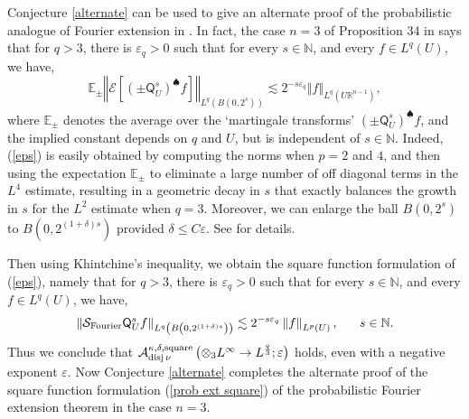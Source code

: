 \documentclass{amsart}%
\theoremstyle{plain}
\numberwithin{equation}{section}
\begin{document}
Conjecture \ref{alternate} can be used to give an alternate proof of the
probabilistic analogue of Fourier extension in \cite{Saw7}. In fact, the case
$n=3$ of Proposition 34 in \cite{Saw7} says that for $q>3$, there is
$\varepsilon_{q}>0$ such that for every $s\in\mathbb{N}$, and every $f\in
L^{q}\left(  U\right)  $, we have,
\begin{equation}
\mathbb{E}_{\pm}\left\Vert \mathcal{E}\left[  \left(  \pm\mathsf{Q}_{U}%
^{s}\right)  ^{\spadesuit}f\right]  \right\Vert _{L^{q}\left(  B\left(
0,2^{s}\right)  \right)  }\lesssim2^{-s\varepsilon_{q}}\left\Vert f\right\Vert
_{L^{q}\left(  U\mathbb{R}^{n-1}\right)  },\label{eps}%
\end{equation}
where $\mathbb{E}_{\pm}$ denotes the average over the `martingale transforms'
$\left(  \pm\mathsf{Q}_{U}^{s}\right)  ^{\spadesuit}f$, and the implied
constant depends on $q$ and $U$, but is independent of $s\in\mathbb{N}$.
Indeed, (\ref{eps}) is easily obtained by computing the norms when $p=2$ and
$4$, and then using the expectation $\mathbb{E}_{\pm}$ to eliminate a large
number of off diagonal terms in the $L^{4}$ estimate, resulting in a geometric
decay in $s$ that exactly balances the growth in $s$ for the $L^{2} $ estimate
when $q=3$. Moreover, we can enlarge the ball $B\left(  0,2^{s}\right)  $ to
$B\left(  0,2^{\left(  1+\delta\right)  s}\right)  $ provided $\delta\leq
C\varepsilon$. See \cite[Section 5]{Saw7} for details.

Then using Khintchine's inequality, we obtain the square function formulation
of (\ref{eps}), namely that for $q>3$, there is $\varepsilon_{q}>0$ such that
for every $s\in\mathbb{N}$, and every $f\in L^{q}\left(  U\right)  $, we have,%
\[
\left\Vert \mathcal{S}_{\mathop{\rm Fourier}}\mathsf{Q}_{U}^{s}f\right\Vert
_{L^{q}\left(  B\left(  0,2^{\left(  1+\delta\right)  s}\right)  \right)
}\lesssim2^{-s\varepsilon_{q}}\left\Vert f\right\Vert _{L^{p}\left(  U\right)
},\ \ \ \ \ s\in\mathbb{N}.
\]
Thus we conclude that $\mathcal{A}_{\mathop{\rm disj}\nu}^{\kappa
,\delta,\mathop{\rm square}}\left(  \otimes_{3}L^{\infty}\rightarrow
L^{\frac{q}{3}};\varepsilon\right)  $ holds, even with a negative exponent
$\varepsilon$. Now Conjecture \ref{alternate} completes the alternate proof of
the square function formulation (\ref{prob ext square}) of the probabilistic
Fourier extension theorem in the case $n=3$.
\end{document}
